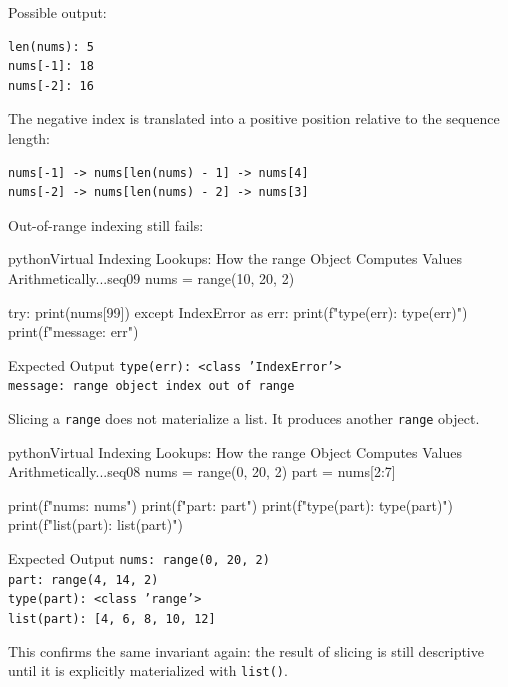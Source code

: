 Possible output:

\begin{verbatim}
len(nums): 5
nums[-1]: 18
nums[-2]: 16
\end{verbatim}

The negative index is translated into a positive position relative to the sequence length:

\begin{verbatim}
nums[-1] -> nums[len(nums) - 1] -> nums[4]
nums[-2] -> nums[len(nums) - 2] -> nums[3]
\end{verbatim}

Out-of-range indexing still fails:

\begin{codebox}[]{python}{Virtual Indexing Lookups: How the range Object Computes Values Arithmetically...}{seq09}
nums = range(10, 20, 2)

try:
    print(nums[99])
except IndexError as err:
    print(f"type(err): {type(err)}")
    print(f"message: {err}")
\end{codebox}


\begin{iobox}{Expected Output}
\texttt{type(err): <class 'IndexError'>} \\
\texttt{message: range object index out of range} \\
\end{iobox}


Slicing a \texttt{range} does not materialize a list. It produces another \texttt{range} object.

\begin{codebox}[]{python}{Virtual Indexing Lookups: How the range Object Computes Values Arithmetically...}{seq08}
nums = range(0, 20, 2)
part = nums[2:7]

print(f"nums: {nums}")
print(f"part: {part}")
print(f"type(part): {type(part)}")
print(f"list(part): {list(part)}")
\end{codebox}


\begin{iobox}{Expected Output}
\texttt{nums: range(0, 20, 2)} \\
\texttt{part: range(4, 14, 2)} \\
\texttt{type(part): <class 'range'>} \\
\texttt{list(part): [4, 6, 8, 10, 12]} \\
\end{iobox}


This confirms the same invariant again: the result of slicing is still descriptive until it is explicitly materialized with \texttt{list()}.

